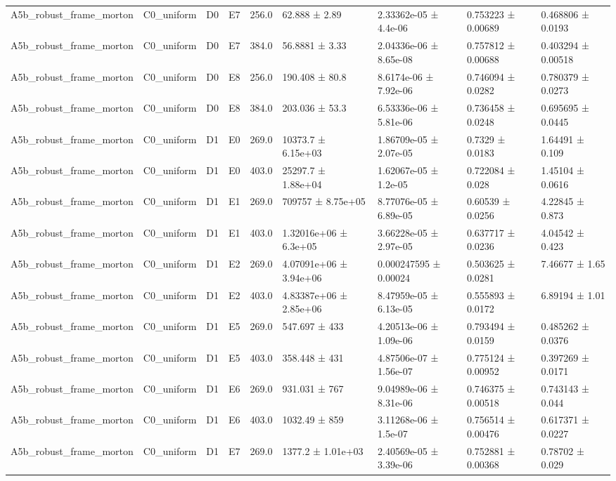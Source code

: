 \begin{table}
\begin{tabular}{lllllllll}
A5b\_robust\_frame\_morton & C0\_uniform & D0 & E7 & 256.0 & 62.888 ± 2.89 & 2.33362e-05 ± 4.4e-06 & 0.753223 ± 0.00689 & 0.468806 ± 0.0193 \\
A5b\_robust\_frame\_morton & C0\_uniform & D0 & E7 & 384.0 & 56.8881 ± 3.33 & 2.04336e-06 ± 8.65e-08 & 0.757812 ± 0.00688 & 0.403294 ± 0.00518 \\
A5b\_robust\_frame\_morton & C0\_uniform & D0 & E8 & 256.0 & 190.408 ± 80.8 & 8.6174e-06 ± 7.92e-06 & 0.746094 ± 0.0282 & 0.780379 ± 0.0273 \\
A5b\_robust\_frame\_morton & C0\_uniform & D0 & E8 & 384.0 & 203.036 ± 53.3 & 6.53336e-06 ± 5.81e-06 & 0.736458 ± 0.0248 & 0.695695 ± 0.0445 \\
A5b\_robust\_frame\_morton & C0\_uniform & D1 & E0 & 269.0 & 10373.7 ± 6.15e+03 & 1.86709e-05 ± 2.07e-05 & 0.7329 ± 0.0183 & 1.64491 ± 0.109 \\
A5b\_robust\_frame\_morton & C0\_uniform & D1 & E0 & 403.0 & 25297.7 ± 1.88e+04 & 1.62067e-05 ± 1.2e-05 & 0.722084 ± 0.028 & 1.45104 ± 0.0616 \\
A5b\_robust\_frame\_morton & C0\_uniform & D1 & E1 & 269.0 & 709757 ± 8.75e+05 & 8.77076e-05 ± 6.89e-05 & 0.60539 ± 0.0256 & 4.22845 ± 0.873 \\
A5b\_robust\_frame\_morton & C0\_uniform & D1 & E1 & 403.0 & 1.32016e+06 ± 6.3e+05 & 3.66228e-05 ± 2.97e-05 & 0.637717 ± 0.0236 & 4.04542 ± 0.423 \\
A5b\_robust\_frame\_morton & C0\_uniform & D1 & E2 & 269.0 & 4.07091e+06 ± 3.94e+06 & 0.000247595 ± 0.00024 & 0.503625 ± 0.0281 & 7.46677 ± 1.65 \\
A5b\_robust\_frame\_morton & C0\_uniform & D1 & E2 & 403.0 & 4.83387e+06 ± 2.85e+06 & 8.47959e-05 ± 6.13e-05 & 0.555893 ± 0.0172 & 6.89194 ± 1.01 \\
A5b\_robust\_frame\_morton & C0\_uniform & D1 & E5 & 269.0 & 547.697 ± 433 & 4.20513e-06 ± 1.09e-06 & 0.793494 ± 0.0159 & 0.485262 ± 0.0376 \\
A5b\_robust\_frame\_morton & C0\_uniform & D1 & E5 & 403.0 & 358.448 ± 431 & 4.87506e-07 ± 1.56e-07 & 0.775124 ± 0.00952 & 0.397269 ± 0.0171 \\
A5b\_robust\_frame\_morton & C0\_uniform & D1 & E6 & 269.0 & 931.031 ± 767 & 9.04989e-06 ± 8.31e-06 & 0.746375 ± 0.00518 & 0.743143 ± 0.044 \\
A5b\_robust\_frame\_morton & C0\_uniform & D1 & E6 & 403.0 & 1032.49 ± 859 & 3.11268e-06 ± 1.5e-07 & 0.756514 ± 0.00476 & 0.617371 ± 0.0227 \\
A5b\_robust\_frame\_morton & C0\_uniform & D1 & E7 & 269.0 & 1377.2 ± 1.01e+03 & 2.40569e-05 ± 3.39e-06 & 0.752881 ± 0.00368 & 0.78702 ± 0.029 \\

\end{tabular}
\end{table}
